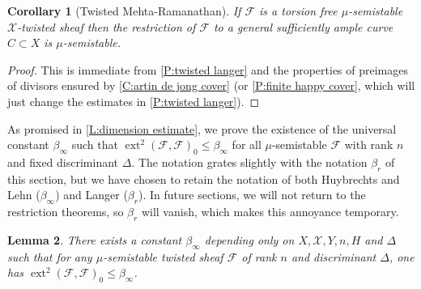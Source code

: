 \documentclass[11pt]{amsart}
\newcommand{\ms}[1]{\mathscr #1}
\DeclareMathOperator{\dimext}{ext}
\renewcommand{\[}{[\!\hspace{0.03em}[}
\renewcommand{\]}{]\!\hspace{0.03em}]}
\renewcommand{\(}{(\!\hspace{0.03em}(}
\renewcommand{\)}{)\!\hspace{0.03em})}
\newtheorem{lem}{Lemma}[subsubsection]%
\newtheorem{cor}[lem]{Corollary}
\theoremstyle{definition}
\theoremstyle{remark}
\begin{document}
\begin{cor}[Twisted Mehta-Ramanathan] If $\ms F$ is a torsion free $\mu$-semistable $\ms 
X$-twisted sheaf then the restriction of $\ms F$ to a general 
sufficiently ample curve $C\subset X$ is $\mu$-semistable.
\end{cor}
\begin{proof} This is immediate from \ref{P:twisted langer} and the 
properties of preimages of divisors ensured by \ref{C:artin de jong cover} 
(or \ref{P:finite happy cover}, which will just change the estimates 
in \ref{P:twisted langer}).
\end{proof}
As promised in \ref{L:dimension estimate}, we prove the existence of the universal constant 
$\beta_{\infty}$ such that $\dimext^{2}(\ms F,\ms 
F)_{0}\leq\beta_{\infty}$ for all $\mu$-semistable $\ms F$ with rank 
$n$ and fixed discriminant $\Delta$.  The notation 
grates slightly with the notation $\beta_{r}$ of this section, but we 
have chosen to retain the notation of both Huybrechts and Lehn 
($\beta_{\infty}$) and Langer ($\beta_{r}$).  In future sections, we 
will not return to the restriction theorems, so $\beta_{r}$ will 
vanish, which makes this annoyance temporary.
\begin{lem}\label{L:universal constant} There exists a constant 
$\beta_{\infty}$ depending only on $X, \ms X, Y, n, H$ and $\Delta$ such that 
for any $\mu$-semistable twisted sheaf $\ms F$ of 
rank $n$ and discriminant $\Delta$, one has $\dimext^{2}(\ms F,\ms 
F)_{0}\leq\beta_{\infty}$.
\end{lem}
\end{document}

